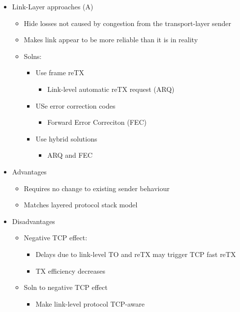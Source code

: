 \documentclass[a4paper]{article}
\begin{document}
\begin{itemize}
	\item Link-Layer approaches (A)
	\begin{itemize}
		\item Hide losses not caused by congestion from the
			transport-layer sender
		\item Makes link appear to be more reliable than it is in
			reality
		\item Solns:
		\begin{itemize}
			\item Use frame reTX
			\begin{itemize}
				\item Link-level automatic reTX request (ARQ)
			\end{itemize}
			\item USe error correction codes
				\begin{itemize}
					\item Forward Error Correciton (FEC)
				\end{itemize}
			\item Use hybrid solutions
			\begin{itemize}
				\item ARQ and FEC
			\end{itemize}
		\end{itemize}
	\end{itemize}
	\item Advantages
	\begin{itemize}
		\item Requires no change to existing sender behaviour
		\item Matches layered protocol stack model
	\end{itemize}
	\item Disadvantages
	\begin{itemize}
		\item Negative TCP effect:
		\begin{itemize}
			\item Delays due to link-level TO and reTX may trigger
				TCP fast reTX
			\item TX efficiency decreases
		\end{itemize}
		\item Soln to negative TCP effect
		\begin{itemize}
			\item Make link-level protocol TCP-aware
		\end{itemize}
	\end{itemize}

\end{itemize}
\end{document}
